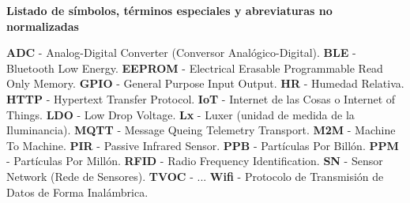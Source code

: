 \renewcommand{\thepage}{\Roman{page}}
    \textbf{\Large Listado de símbolos, términos especiales y abreviaturas no normalizadas}\newline

    \textbf{ADC} - Analog-Digital Converter (Conversor Analógico-Digital).
    \newline
    \textbf{BLE} - Bluetooth Low Energy.
    \newline
    \textbf{EEPROM} - Electrical Erasable Programmable Read Only Memory.
    \newline
    \textbf{GPIO} - General Purpose Input Output.
    \newline
    \textbf{HR} - Humedad Relativa.
    \newline
    \textbf{HTTP} - Hypertext Transfer Protocol.
    \newline
    \textbf{IoT} - Internet de las Cosas o Internet of Things.
    \newline
    \textbf{LDO} - Low Drop Voltage.
    \newline
    \textbf{Lx} - Luxer (unidad de medida de la Iluminancia).
    \newline
    \textbf{MQTT} - Message Queing Telemetry Transport.
    \newline
    \textbf{M2M} - Machine To Machine.
    \newline
    \textbf{PIR} - Passive Infrared Sensor.
    \newline
    \textbf{PPB} - Partículas Por Billón.
    \newline
    \textbf{PPM} - Partículas Por Millón.
    \newline
    \textbf{RFID} - Radio Frequency Identification.
    \newline
    \textbf{SN} - Sensor Network (Rede de Sensores).
    \newline
    \textbf{TVOC} - ...
    \newline
    \textbf{Wifi} - Protocolo de Transmisión de Datos de Forma Inalámbrica.
    
    \setcounter{page}{1}
    \thispagestyle{plain}